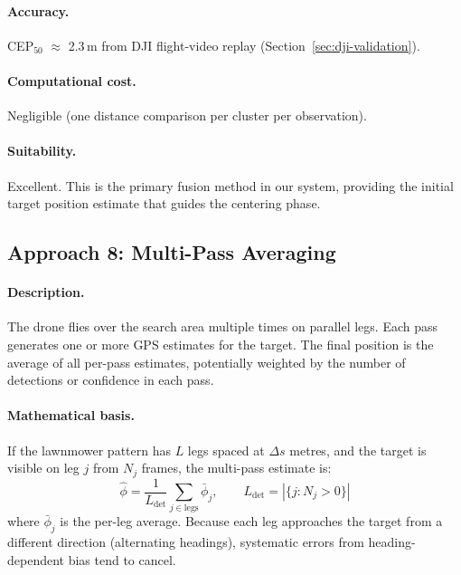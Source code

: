 \paragraph{Accuracy.}  CEP$_{50}$ $\approx$ 2.3\,m from DJI flight-video replay (Section~\ref{sec:dji-validation}).

\paragraph{Computational cost.}  Negligible (one distance comparison per cluster per observation).

\paragraph{Suitability.}  Excellent.  This is the primary fusion method in our system, providing the initial target position estimate that guides the centering phase.

\subsection{Approach 8: Multi-Pass Averaging}\label{sec:approach-multipass}

\paragraph{Description.}
The drone flies over the search area multiple times on parallel legs.  Each pass generates one or more GPS estimates for the target.  The final position is the average of all per-pass estimates, potentially weighted by the number of detections or confidence in each pass.

\paragraph{Mathematical basis.}
If the lawnmower pattern has $L$ legs spaced at $\Delta s$ metres, and the target is visible on leg $j$ from $N_j$ frames, the multi-pass estimate is:
\begin{equation}
  \hat{\phi} = \frac{1}{L_\mathrm{det}} \sum_{j \in \mathrm{legs}} \bar{\phi}_j, \qquad
  L_\mathrm{det} = |\{j : N_j > 0\}|
\end{equation}
where $\bar{\phi}_j$ is the per-leg average.  Because each leg approaches the target from a different direction (alternating headings), systematic errors from heading-dependent bias tend to cancel.

